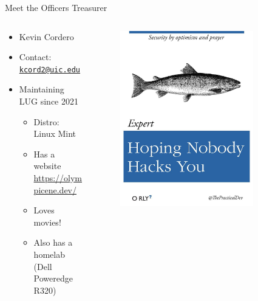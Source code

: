 \documentclass{beamer}
\begin{document}
\begin{frame}{Meet the Officers}
	{\Huge Treasurer}
	\begin{columns}
		\begin{column}{0.5\textwidth}
			\begin{itemize}
				\item {\Large Kevin Cordero}
				\item Contact:
					\href{mailto:kcord2@uic.edu}{\texttt{kcord2@uic.edu}}
				\item Maintaining LUG since 2021
				\begin{itemize}
					\item Distro: Linux Mint
					\item Has a website
						\url{https://olympicene.dev/}
					\item Loves movies!
					\item Also has a homelab (Dell
						Poweredge R320)
				\end{itemize}
			\end{itemize}
		\end{column}
		\begin{column}{0.5\textwidth}
			\begin{figure}
				\centering
				\includegraphics[width=0.8\textwidth]{security.png}
			\end{figure}
		\end{column}
	\end{columns}
\end{frame}
\end{document}
